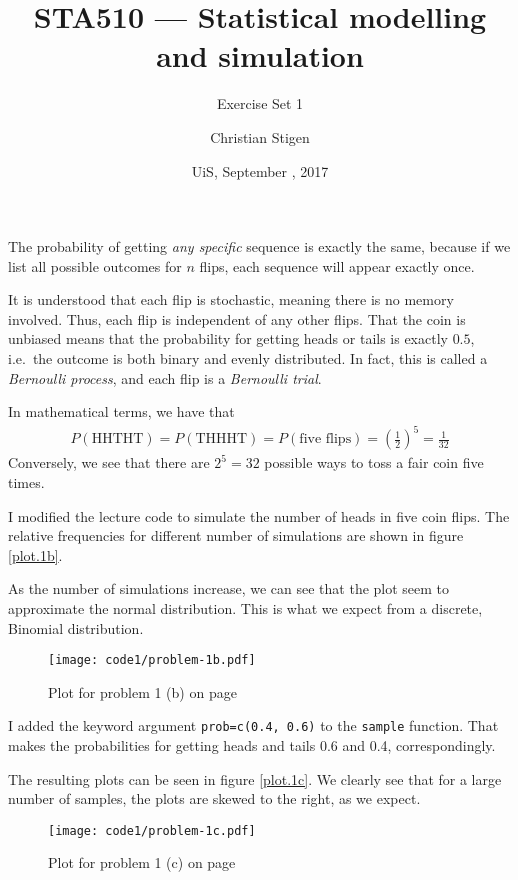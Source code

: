 \documentclass[a4paper,english,12pt]{article}
\title{STA510 --- Statistical modelling and simulation}
\subtitle{Exercise Set 1}
\author{Christian Stigen}
\date{UiS, September \nth{21}, 2017}
\begin{document}
\maketitle

The probability of getting \textit{any specific} sequence is exactly the same,
because if we list all possible outcomes for $n$ flips, each sequence will
appear exactly once.

It is understood that each flip is stochastic, meaning there is no memory
involved. Thus, each flip is independent of any other flips. That the coin is
unbiased means that the probability for getting heads or tails is exactly
$0.5$, i.e.~the outcome is both binary and evenly distributed. In fact, this is
called a \textit{Bernoulli process}, and each flip is a \textit{Bernoulli
trial}.

In mathematical terms, we have that
\begin{align*}
  P(\textrm{HHTHT}) = P(\textrm{THHHT}) = P(\textrm{five flips}) =
    \left(\frac{1}{2}\right)^5 = \frac{1}{32}
\end{align*}
Conversely, we see that there are $2^5 = 32$ possible ways to toss a fair coin
five times.

I modified the lecture code to simulate the number of heads in five coin flips.
The relative frequencies for different number of simulations are shown in
figure \vref{plot.1b}.

As the number of simulations increase, we can see that the plot seem to
approximate the normal distribution. This is what we expect from a discrete,
Binomial distribution.
\begin{figure}[h]
  \texttt{[image: code1/problem-1b.pdf]}
  \caption{Plot for problem 1 (b) on page \pageref{problem.1 (b)}}
  \label{plot.1b}
\end{figure}

I added the keyword argument \texttt{prob=c(0.4, 0.6)} to the \texttt{sample}
function. That makes the probabilities for getting heads and tails 0.6 and 0.4,
correspondingly.

The resulting plots can be seen in figure \vref{plot.1c}. We clearly see that
for a large number of samples, the plots are skewed to the right, as we expect.
\begin{figure}[h]
  \texttt{[image: code1/problem-1c.pdf]}
  \caption{Plot for problem 1 (c) on page \pageref{problem.1 (c)}}
  \label{plot.1c}
\end{figure}
\end{document}
